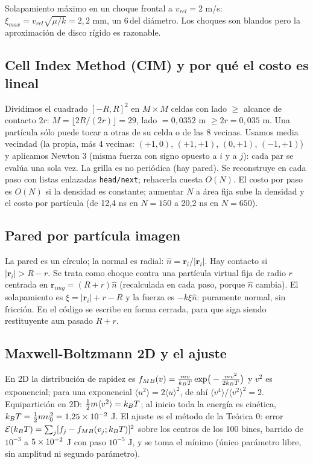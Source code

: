 \documentclass[10.5pt,a4paper]{article}
\begin{document}
Solapamiento máximo en un choque frontal a $v_{rel}=2$ m/s: $\xi_{max}=v_{rel}\sqrt{\mu/k}=2{,}2$ mm, un 6\,\pc del diámetro. Los choques son blandos pero la aproximación de disco rígido es razonable.

\subsection{Cell Index Method (CIM) y por qué el costo es lineal}
Dividimos el cuadrado $[-R,R]^2$ en $M\times M$ celdas con lado $\ge$ alcance de contacto $2r$: $M=\lfloor2R/(2r)\rfloor=29$, lado $=0{,}0352$ m $\ge2r=0{,}035$ m. Una partícula sólo puede tocar a otras de su celda o de las 8 vecinas. Usamos media vecindad (la propia, más 4 vecinas: $(+1,0)$, $(+1,+1)$, $(0,+1)$, $(-1,+1)$) y aplicamos Newton 3 (misma fuerza con signo opuesto a $i$ y a $j$): cada par se evalúa una sola vez. La grilla es no periódica (hay pared). Se reconstruye en cada paso con listas enlazadas \texttt{head/next}; rehacerla cuesta $O(N)$. El costo por paso es $O(N)$ si la densidad es constante; aumentar $N$ a área fija sube la densidad y el costo por partícula (de 12,4 ns en $N=150$ a 20,2 ns en $N=650$).

\subsection{Pared por partícula imagen}
La pared es un círculo; la normal es radial: $\hat n=\mathbf r_i/|\mathbf r_i|$. Hay contacto si $|\mathbf r_i|>R-r$. Se trata como choque contra una partícula virtual fija de radio $r$ centrada en $\mathbf r_{img}=(R+r)\hat n$ (recalculada en cada paso, porque $\hat n$ cambia). El solapamiento es $\xi=|\mathbf r_i|+r-R$ y la fuerza es $-k\xi\hat n$: puramente normal, sin fricción. En el código se escribe en forma cerrada, para que siga siendo restituyente aun pasado $R+r$.

\subsection{Maxwell-Boltzmann 2D y el ajuste}
En 2D la distribución de rapidez es $f_{MB}(v)=\frac{mv}{k_BT}\exp\!\big(-\frac{mv^2}{2k_BT}\big)$ y $v^2$ es exponencial; para una exponencial $\langle u^2\rangle=2\langle u\rangle^2$, de ahí $\langle v^4\rangle/\langle v^2\rangle^2=2$. Equipartición en 2D: $\tfrac12m\langle v^2\rangle=k_BT$; al inicio toda la energía es cinética, $k_BT=\tfrac12mv_0^2=1{,}25\times10^{-2}$ J. El ajuste es el método de la Teórica 0: error $\mathcal E(k_BT)=\sum_j[f_j-f_{MB}(v_j;k_BT)]^2$ sobre los centros de los 100 bines, barrido de $10^{-3}$ a $5\times10^{-2}$ J con paso $10^{-5}$ J, y se toma el mínimo (único parámetro libre, sin amplitud ni segundo parámetro).
\end{document}
